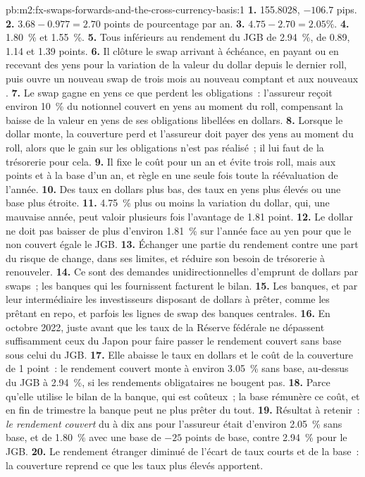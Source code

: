 \begin{solution}{pb:m2:fx-swaps-forwards-and-the-cross-currency-basis:1}
\textbf{1.} 155.8028, $-106.7$ pips.
\textbf{2.} $3.68 - 0.977 = 2.70$ points de pourcentage par an.
\textbf{3.} $4.75 - 2.70 = 2.05\%$.
\textbf{4.} 1.80~\% et 1.55~\%.
\textbf{5.} Tous inférieurs au rendement du JGB de 2.94~\%, de 0.89, 1.14 et 1.39 points.
\textbf{6.} Il clôture le swap arrivant à échéance, en payant ou en recevant des yens
pour la variation de la valeur du dollar depuis le dernier roll, puis ouvre un nouveau swap de trois mois au
nouveau comptant et aux nouveaux .
\textbf{7.} Le swap gagne en yens ce que perdent les obligations~: l'assureur reçoit environ
10~\% du notionnel couvert en yens au moment du roll, compensant la baisse de la valeur en yens
de ses obligations libellées en dollars.
\textbf{8.} Lorsque le dollar monte, la couverture perd et l'assureur doit payer des yens
au moment du roll, alors que le gain sur les obligations n'est pas réalisé~; il lui faut de la trésorerie pour cela.
\textbf{9.} Il fixe le coût pour un an et évite trois roll, mais aux points et à la base
d'un an, et règle en une seule fois toute la réévaluation de l'année.
\textbf{10.} Des taux en dollars plus bas, des taux en yens plus élevés ou une base plus étroite.
\textbf{11.} 4.75~\% plus ou moins la variation du dollar, qui, une mauvaise année, peut
valoir plusieurs fois l'avantage de 1.81 point.
\textbf{12.} Le dollar ne doit pas baisser de plus d'environ 1.81~\% sur l'année face au
yen pour que le  non couvert égale le JGB.
\textbf{13.} Échanger une partie du rendement contre une part du risque de change, dans ses limites, et
réduire son besoin de trésorerie à renouveler.
\textbf{14.} Ce sont des demandes unidirectionnelles d'emprunt de dollars par swaps~; les
banques qui les fournissent facturent le bilan.
\textbf{15.} Les banques, et par leur intermédiaire les investisseurs disposant de dollars à prêter, comme les 
prêtant en repo, et parfois les lignes de swap des banques centrales.
\textbf{16.} En octobre 2022, juste avant que les taux de la Réserve fédérale ne dépassent
suffisamment ceux du Japon pour faire passer le rendement couvert sans base sous celui du JGB.
\textbf{17.} Elle abaisse le taux en dollars et le coût de la couverture de 1 point~: le
rendement couvert monte à environ 3.05~\% sans base, au-dessus du JGB à 2.94~\%, si les
rendements obligataires ne bougent pas.
\textbf{18.} Parce qu'elle utilise le bilan de la banque, qui est coûteux~; la base
rémunère ce coût, et en fin de trimestre la banque peut ne plus prêter du tout.
\textbf{19.} Résultat à retenir~: \emph{le rendement couvert} du  à dix ans
pour l'assureur était d'environ 2.05~\% sans base, et de 1.80~\% avec une base de
$-25$ points de base, contre 2.94~\% pour le JGB.
\textbf{20.} Le rendement étranger diminué de l'écart de taux courts et de la base~:
la couverture reprend ce que les taux plus élevés apportent.
\end{solution}

